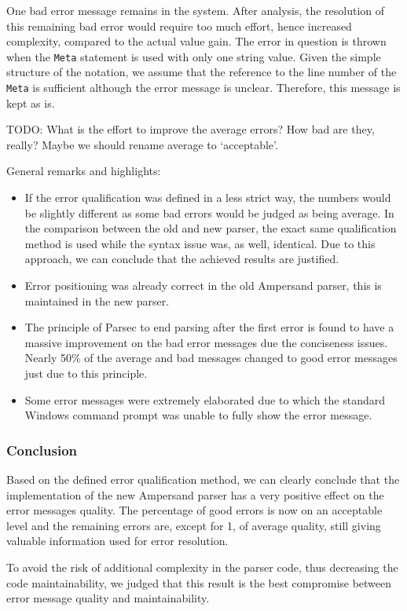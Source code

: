 One bad error message remains in the system.
After analysis, the resolution of this remaining bad error would require too much effort, hence increased complexity, compared to the actual value gain.
The error in question is thrown when the \texttt{Meta} statement is used with only one string value. 
Given the simple structure of the notation, we assume that the reference to the line number of the \texttt{Meta} is sufficient although the error message is unclear.
Therefore, this message is kept as is.


TODO: What is the effort to improve the average errors? How bad are they, really? Maybe we should rename average to `acceptable'.

General remarks and highlights:
 \begin{itemize}
	\item 	If the error qualification was defined in a less strict way, the numbers would be slightly different as some bad errors would be judged as being average. 
		In the comparison between the old and new parser, the exact same qualification method is used while the syntax issue was, as well, identical.
		Due to this approach, we can conclude that the achieved results are justified.
	\item 	Error positioning was already correct in the old Ampersand parser, this is maintained in the new parser.
	\item 	The principle of Parsec to end parsing after the first error is found to have a massive improvement on the bad error messages due the conciseness issues.
		Nearly 50\% of the average and bad messages changed to good error messages just due to this principle.
	\item 	Some error messages were extremely elaborated due to which the standard Windows command prompt was unable to fully show the error message.
\end {itemize}

\subsubsection{Conclusion}
Based on the defined error qualification method, we can clearly conclude that the implementation of the new Ampersand parser has a very positive effect on the error messages quality.
The percentage of good errors is now on an acceptable level and the remaining errors are, except for 1, of average quality, still giving valuable information used for error resolution.

To avoid the risk of additional complexity in the parser code, thus decreasing the code maintainability, we judged that this result is  the best compromise between error message quality and maintainability.

